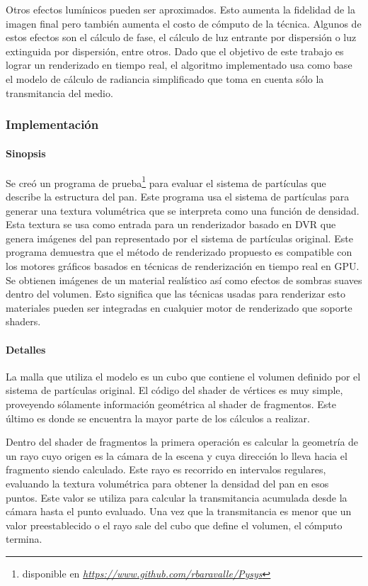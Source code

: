 \documentclass[oneside,a4paper,spanish,links]{amca}
\begin{document}
Otros efectos lumínicos pueden ser aproximados. Esto aumenta la
fidelidad de la imagen final pero también aumenta el costo de cómputo
de la técnica. Algunos de estos efectos son el cálculo de fase, el c\'alculo de
luz entrante por dispersión o luz extinguida por dispersión, entre
otros. Dado que el objetivo de este trabajo es lograr un renderizado
en tiempo real, el algoritmo implementado usa como base el modelo de
cálculo de radiancia simplificado que toma en cuenta sólo la
transmitancia del medio.

\subsubsection{Implementación}

\paragraph{Sinopsis}

Se cre\'o un programa de prueba\footnote{disponible en
  \emph{\url{https://www.github.com/rbaravalle/Pysys}}} para evaluar el sistema de partículas que describe la estructura del
pan. Este programa usa el sistema de partículas para generar una
textura volumétrica que se interpreta como una función de
densidad. Esta textura se usa como entrada para un renderizador basado
en DVR que genera imágenes del pan representado por el sistema de
partículas original. Este programa demuestra que el método de
renderizado propuesto es compatible con los motores gráficos basados en
técnicas de renderización en tiempo real en GPU. Se obtienen imágenes
de un material realístico así como efectos de sombras suaves dentro
del volumen. Esto significa que las técnicas usadas para renderizar
esto materiales pueden ser integradas en cualquier motor de
renderizado que soporte shaders.

\paragraph{Detalles}

La malla que utiliza el modelo es un cubo que contiene el volumen
definido por el sistema de partículas original. El código del shader
de vértices es muy simple, proveyendo sólamente información geométrica
al shader de fragmentos. Este último es donde se encuentra la mayor
parte de los cálculos a realizar.

Dentro del shader de fragmentos la primera operaci\'on es calcular la
geometría de un rayo cuyo origen es la cámara de la escena y cuya
dirección lo lleva hacia el fragmento siendo calculado. Este rayo es
recorrido en intervalos regulares, evaluando la textura volumétrica
para obtener la densidad del pan en esos puntos. Este valor se utiliza
para calcular la transmitancia acumulada desde la cámara hasta el
punto evaluado. Una vez que la transmitancia es menor que un valor
preestablecido o el rayo sale del cubo que define el volumen, el
cómputo termina.
\end{document}
